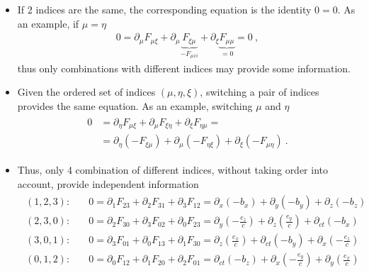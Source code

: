 \documentclass[letterpaper,10pt,english]{jupyterBook}
\begin{document}
\begin{itemize}
\item {} 
\sphinxAtStartPar
If 2 indices are the same, the corresponding equation is the identity \(0 = 0\). As an example, if \(\mu = \eta\)
\begin{equation*}
\begin{split}0 =  \partial_{\mu} F_{\mu \xi} + \partial_{\mu} \underbrace{F_{\xi \mu}}_{-F_{\mu xi}} + \partial_{\xi} \underbrace{F_{\mu \mu}}_{=0} = 0 \ , \end{split}
\end{equation*}
\sphinxAtStartPar
thus only combinations with different indices may provide some information.

\item {} 
\sphinxAtStartPar
Given the ordered set of indices \((\mu, \eta, \xi)\), switching a pair of indices provides the same equation. As an example, switching \(\mu\) and \(\eta\)
\begin{equation*}
\begin{split}\begin{aligned}
    0 & = \partial_{\eta} F_{\mu  \xi} + \partial_{\mu} F_{\xi \eta} + \partial_{\xi} F_{\eta \mu} = \\
      & = \partial_{\eta} ( - F_{\xi \mu} ) + \partial_{\mu} ( - F_{\eta \xi} ) + \partial_{\xi} ( -F_{\mu \eta} ) \ .
  \end{aligned}\end{split}
\end{equation*}
\item {} 
\sphinxAtStartPar
Thus, only 4 combination of different indices, without taking order into account, provide independent information
\begin{equation*}
\begin{split}\begin{aligned}
    (1,2,3): & \quad 0 = \partial_{1} F_{23} + \partial_{2} F_{31} + \partial_{3} F_{12} = \partial_x (-b_x) + \partial_y (-b_y) + \partial_z (-b_z)  \\
    (2,3,0): & \quad 0 = \partial_{2} F_{30} + \partial_{3} F_{02} + \partial_{0} F_{23} = \partial_y \left(-\frac{e_z}{c} \right) + \partial_z \left( \frac{e_y}{c} \right) + \partial_{ct} (-b_x) \\
    (3,0,1): & \quad 0 = \partial_{3} F_{01} + \partial_{0} F_{13} + \partial_{1} F_{30} = \partial_z \left(\frac{e_x}{c}\right) + \partial_{ct} (-b_y) + \partial_x  \left(-\frac{e_z}{c}\right) \\
    (0,1,2): & \quad 0 = \partial_{0} F_{12} + \partial_{1} F_{20} + \partial_{2} F_{01} = \partial_{ct} (-b_z) + \partial_x \left(-\frac{e_y}{c}\right) + \partial_y  \left(\frac{e_x}{c}\right)     \\

\end{aligned}
\end{split}
\end{equation*}
\end{itemize}
\end{document}
